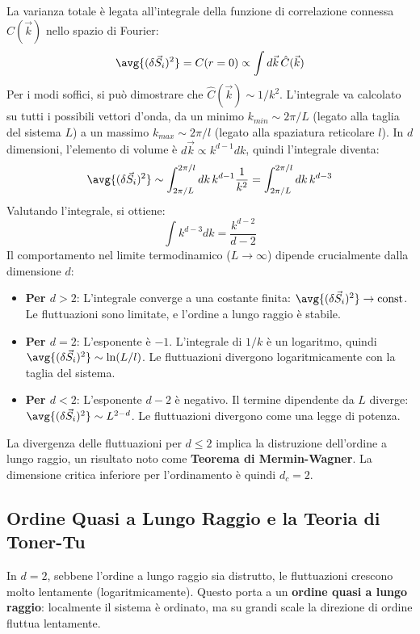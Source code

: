 La varianza totale è legata all'integrale della funzione di correlazione connessa $\hat{C}(\vec{k})$ nello spazio di Fourier:
\begin{equation}
    \avg{(\delta\vec{S}_i)^2} = C(r=0) \propto \int d\vec{k} \, \hat{C}(\vec{k})
\end{equation}
Per i modi soffici, si può dimostrare che $\hat{C}(\vec{k}) \sim 1/k^2$. L'integrale va calcolato su tutti i possibili vettori d'onda, da un minimo $k_{min} \sim 2\pi/L$ (legato alla taglia del sistema $L$) a un massimo $k_{max} \sim 2\pi/l$ (legato alla spaziatura reticolare $l$). In $d$ dimensioni, l'elemento di volume è $d\vec{k} \propto k^{d-1}dk$, quindi l'integrale diventa:
\begin{equation}
    \avg{(\delta\vec{S}_i)^2} \sim \int_{2\pi/L}^{2\pi/l} dk \, k^{d-1} \frac{1}{k^2} = \int_{2\pi/L}^{2\pi/l} dk \, k^{d-3} \label{eq:integral_fluct}
\end{equation}
Valutando l'integrale, si ottiene:
\begin{equation}
    \int k^{d-3} dk = \frac{k^{d-2}}{d-2}
\end{equation}
Il comportamento nel limite termodinamico ($L \to \infty$) dipende crucialmente dalla dimensione $d$:
\begin{itemize}
    \item \textbf{Per $d > 2$}: L'integrale converge a una costante finita: $\avg{(\delta\vec{S}_i)^2} \to \text{const}$. Le fluttuazioni sono limitate, e l'ordine a lungo raggio è stabile.
    \item \textbf{Per $d = 2$}: L'esponente è $-1$. L'integrale di $1/k$ è un logaritmo, quindi $\avg{(\delta\vec{S}_i)^2} \sim \ln(L/l)$. Le fluttuazioni divergono logaritmicamente con la taglia del sistema.
    \item \textbf{Per $d < 2$}: L'esponente $d-2$ è negativo. Il termine dipendente da $L$ diverge: $\avg{(\delta\vec{S}_i)^2} \sim L^{2-d}$. Le fluttuazioni divergono come una legge di potenza.
\end{itemize}
La divergenza delle fluttuazioni per $d \le 2$ implica la distruzione dell'ordine a lungo raggio, un risultato noto come \textbf{Teorema di Mermin-Wagner}. La dimensione critica inferiore per l'ordinamento è quindi $d_c=2$.

\subsection{Ordine Quasi a Lungo Raggio e la Teoria di Toner-Tu}
In $d=2$, sebbene l'ordine a lungo raggio sia distrutto, le fluttuazioni crescono molto lentamente (logaritmicamente). Questo porta a un \textbf{ordine quasi a lungo raggio}: localmente il sistema è ordinato, ma su grandi scale la direzione di ordine fluttua lentamente.

